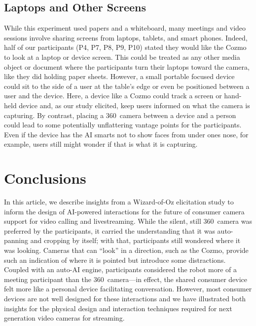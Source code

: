 \documentclass{tufte-handout}
\begin{document}
\subsection{Laptops and Other Screens}
While this experiment used papers and a whiteboard, many meetings and
video sessions involve sharing screens from laptops, tablets, and
smart phones. Indeed, half of our participants (P4, P7, P8, P9, P10)
stated they would like the Cozmo to look at a laptop or device
screen. This could be treated as any other media object or document
where the participants turn their laptops toward the camera, like they
did holding paper sheets.  However, a small portable focused device
could sit to the side of a user at the table's edge or even be
positioned between a user and the device. Here, a device like a Cozmo
could track a screen or hand-held device and, as our study elicited,
keep users informed on what the camera is capturing.  By contrast,
placing a 360\textdegree\ camera between a device and a person could
lead to some potentially unflattering vantage points for the
participants. Even if the device has the AI smarts not to show faces
from under ones nose, for example, users still might wonder if that is
what it is capturing.

\section{Conclusions}
In this article, we describe insights from a Wizard-of-Oz elicitation
study to inform the design of AI-powered interactions for the future
of consumer camera support for video calling and livestreaming. While
the silent, still 360\textdegree\ camera was preferred by the
participants, it carried the understanding that it was auto-panning
and cropping by itself; with that, participants still wondered where
it was looking. Cameras that can ``look'' in a direction, such as the
Cozmo, provide such an indication of where it is pointed but introduce
some distractions. Coupled with an auto-AI engine, participants
considered the robot more of a meeting participant than the
360\textdegree\ camera---in effect, the shared consumer device felt
more like a personal device facilitating conversation.  However, most
consumer devices are not well designed for these interactions and we
have illustrated both insights for the physical design and interaction
techniques required for next generation video cameras for streaming.


\balance%



\end{document}
